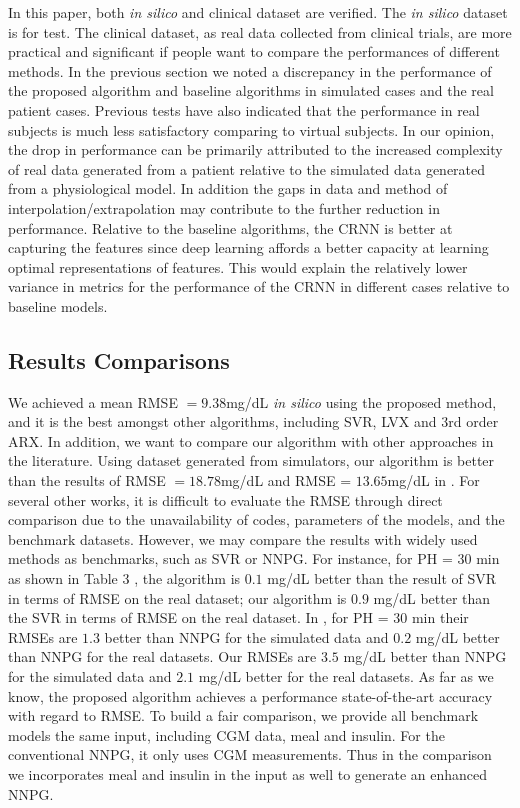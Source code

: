 \documentclass[a4paper, 10 pt, twocolumn]{IEEEtran}
\begin{document}
 In this paper, both \emph{in silico} and clinical dataset are verified. The \emph{in silico} dataset is for test. The clinical dataset, as real data collected from clinical trials, are more practical and significant if
 people want to compare the performances of different methods.
In the previous section we noted a discrepancy in the performance of the proposed algorithm and baseline algorithms in simulated cases and the real patient cases. Previous tests have also indicated that the performance in
real subjects is much less satisfactory comparing to virtual subjects. In our opinion, the drop in performance can be primarily attributed to the increased complexity of real data generated from a patient relative to the
simulated data generated from a physiological model. In addition the gaps in data and method of interpolation/extrapolation may contribute to the further reduction in performance. Relative to the baseline algorithms, the
CRNN is better at capturing the features since deep learning affords a better capacity at learning optimal representations of features. This would explain the relatively lower variance in metrics for the performance of
the CRNN in different cases relative to baseline models.


\subsection{Results Comparisons}
We achieved a mean RMSE $=9.38$mg/dL \emph{in silico} using the proposed method, and it is the best amongst other algorithms, including SVR, LVX and 3rd order ARX. In addition, we want to compare our algorithm with other
approaches in the literature.  {Using dataset generated from simulators,} our algorithm is better than the results of RMSE $= 18.78$mg/dL \cite{Sparacino-GluCon2007} and RMSE = $13.65$mg/dL in
\cite{Mougiakakou-NNbasedGlucose}.
For several other works, it is difficult to evaluate the RMSE through direct comparison  {due to the unavailability of codes, parameters of the models, and the benchmark datasets.} However, we may compare the results with
widely used methods as benchmarks, such as SVR or NNPG.
 For instance, for PH = 30 min as shown in Table 3 \cite{Plis-AMachine2014},  the algorithm is $0.1$ mg/dL better than the result of SVR in terms of RMSE on the real dataset; our algorithm is $0.9$ mg/dL better than the
 SVR in terms of RMSE on the real dataset. In \cite{Zecchin-NNIncor2012}, for PH = 30 min their RMSEs are $1.3$ better than NNPG for the simulated data and $0.2$ mg/dL better than NNPG for the real datasets. Our RMSEs are
 $3.5$ mg/dL better than NNPG for the simulated data and $2.1$ mg/dL better for the real datasets. As far as we know, the proposed algorithm achieves a performance state-of-the-art accuracy with regard to RMSE.
To build a fair comparison, we provide all benchmark models the same input, including CGM data, meal and insulin. For the conventional NNPG, it only uses CGM measurements. Thus in the comparison we incorporates meal and
insulin in the input as well to generate an enhanced NNPG.
\end{document}
